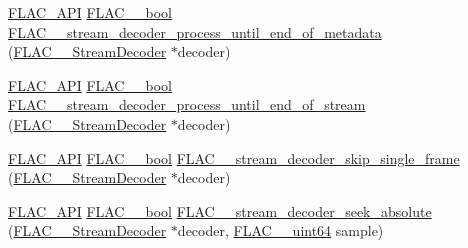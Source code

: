 \begin{DoxyCompactItemize}
\item 
\hyperlink{group__flac__export_ga56ca07df8a23310707732b1c0007d6f5}{F\+L\+A\+C\+\_\+\+A\+PI} \hyperlink{ordinals_8h_a95103469f1cbd78b8cf250194985b34e}{F\+L\+A\+C\+\_\+\+\_\+bool} \hyperlink{group__flac__stream__decoder_ga5e07ca9bf67dabf2521737f63b2156e2}{F\+L\+A\+C\+\_\+\+\_\+stream\+\_\+decoder\+\_\+process\+\_\+until\+\_\+end\+\_\+of\+\_\+metadata} (\hyperlink{struct_f_l_a_c_____stream_decoder}{F\+L\+A\+C\+\_\+\+\_\+\+Stream\+Decoder} $\ast$decoder)
\item 
\hyperlink{group__flac__export_ga56ca07df8a23310707732b1c0007d6f5}{F\+L\+A\+C\+\_\+\+A\+PI} \hyperlink{ordinals_8h_a95103469f1cbd78b8cf250194985b34e}{F\+L\+A\+C\+\_\+\+\_\+bool} \hyperlink{group__flac__stream__decoder_ga4544352442870ea9f16f388a97d81dff}{F\+L\+A\+C\+\_\+\+\_\+stream\+\_\+decoder\+\_\+process\+\_\+until\+\_\+end\+\_\+of\+\_\+stream} (\hyperlink{struct_f_l_a_c_____stream_decoder}{F\+L\+A\+C\+\_\+\+\_\+\+Stream\+Decoder} $\ast$decoder)
\item 
\hyperlink{group__flac__export_ga56ca07df8a23310707732b1c0007d6f5}{F\+L\+A\+C\+\_\+\+A\+PI} \hyperlink{ordinals_8h_a95103469f1cbd78b8cf250194985b34e}{F\+L\+A\+C\+\_\+\+\_\+bool} \hyperlink{group__flac__stream__decoder_ga371bc2b4f5571e40c47f4db5a8a745f8}{F\+L\+A\+C\+\_\+\+\_\+stream\+\_\+decoder\+\_\+skip\+\_\+single\+\_\+frame} (\hyperlink{struct_f_l_a_c_____stream_decoder}{F\+L\+A\+C\+\_\+\+\_\+\+Stream\+Decoder} $\ast$decoder)
\item 
\hyperlink{group__flac__export_ga56ca07df8a23310707732b1c0007d6f5}{F\+L\+A\+C\+\_\+\+A\+PI} \hyperlink{ordinals_8h_a95103469f1cbd78b8cf250194985b34e}{F\+L\+A\+C\+\_\+\+\_\+bool} \hyperlink{group__flac__stream__decoder_ga5c1c70de72e6ed49db6d61a9131d9117}{F\+L\+A\+C\+\_\+\+\_\+stream\+\_\+decoder\+\_\+seek\+\_\+absolute} (\hyperlink{struct_f_l_a_c_____stream_decoder}{F\+L\+A\+C\+\_\+\+\_\+\+Stream\+Decoder} $\ast$decoder, \hyperlink{ordinals_8h_aa78c8c70a3eb8a58af7436f278acde8e}{F\+L\+A\+C\+\_\+\+\_\+uint64} sample)
\end{DoxyCompactItemize}
